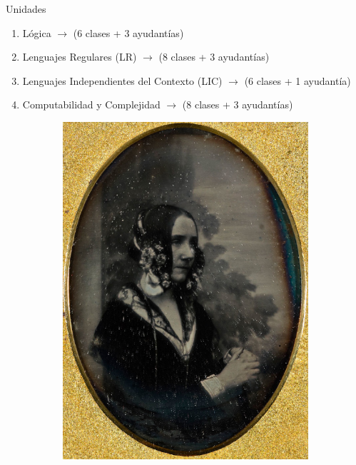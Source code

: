 \documentclass{beamer}
\begin{document}
\begin{frame}{Unidades}
  \begin{enumerate}[<+->]
    \item Lógica $\rightarrow$ (6 clases + 3 ayudantías)
    \item Lenguajes Regulares (LR)  $\rightarrow$ (8 clases + 3 ayudantías)
    \item Lenguajes Independientes del Contexto (LIC) $\rightarrow$ (6 clases +
          1 ayudantía)
    \item Computabilidad y Complejidad $\rightarrow$ (8 clases + 3 ayudantías)
  \end{enumerate}

\begin{figure}
    \centering
    \begin{subfigure}{0.24\textwidth}
        \centering
        \includegraphics[width=\linewidth]{images/ada_lovelace.jpg}
    \end{subfigure}

\end{figure}
\end{frame}
\end{document}
